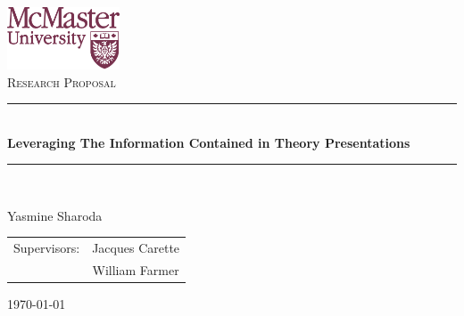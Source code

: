\documentclass[12pt,fleqn]{article}
\begin{document}
	
\begin{titlepage}
	\begin{center}
		\includegraphics[width=0.25\textwidth]{figures/Maclogo}~\\[1cm]
		\textsc{\Large Research Proposal}\\[0.5cm]
		\rule{\linewidth}{0.5mm} \\[0.4cm]
		{ \huge \bfseries Leveraging The Information Contained in Theory Presentations  \\[0.4cm] }
		\rule{\linewidth}{0.5mm} \\[1.5cm]
		\begin{minipage}{0.4\textwidth}
			\begin{center}\large
				\large{Yasmine Sharoda}\\
				\vspace{2cm}
				\begin{tabular}{c c}
					Supervisors: & Jacques Carette \\
					                    & William Farmer 
				\end{tabular}
			\end{center}
		\end{minipage}
		
		\vfill
		{\large \today}
	\end{center}
\end{titlepage}	















\end{document}
